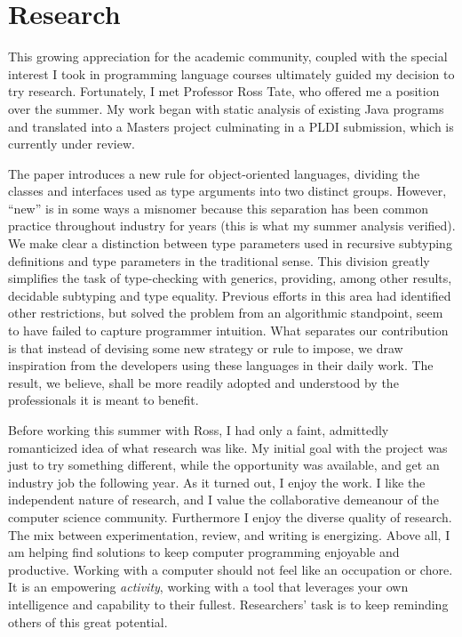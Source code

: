 \documentclass{article}
\begin{document}
\section{Research}
This growing appreciation for the academic community, coupled with the special interest I took in programming language courses ultimately guided my decision to try research.
Fortunately, I met Professor Ross Tate, who offered me a position over the summer.
My work began with static analysis of existing Java programs and translated into a Masters project culminating in a PLDI submission, which is currently under review.

The paper introduces a new rule for object-oriented languages, dividing the classes and interfaces used as type arguments into two distinct groups.
However, ``new'' is in some ways a misnomer because this separation has been common practice throughout industry for years (this is what my summer analysis verified).
We make clear a distinction between type parameters used in recursive subtyping definitions and type parameters in the traditional sense.
This division greatly simplifies the task of type-checking with generics, providing, among other results, decidable subtyping and type equality.
Previous efforts in this area had identified other restrictions, but solved the problem from an algorithmic standpoint, seem to have failed to capture programmer intuition.
What separates our contribution is that instead of devising some new strategy or rule to impose, we draw inspiration from the developers using these languages in their daily work.
The result, we believe, shall be more readily adopted and understood by the professionals it is meant to benefit.

Before working this summer with Ross, I had only a faint, admittedly romanticized idea of what research was like.
My initial goal with the project was just to try something different, while the opportunity was available, and get an industry job the following year.
As it turned out, I enjoy the work. 
I like the independent nature of research, and I value the collaborative demeanour of the computer science community.
Furthermore I enjoy the diverse quality of research. 
The mix between experimentation, review, and writing is energizing.
Above all, I am helping find solutions to keep computer programming enjoyable and productive.
Working with a computer should not feel like an occupation or chore.
It is an empowering \emph{activity}, working with a tool that leverages your own intelligence and capability to their fullest.
Researchers' task is to keep reminding others of this great potential.
\end{document}

